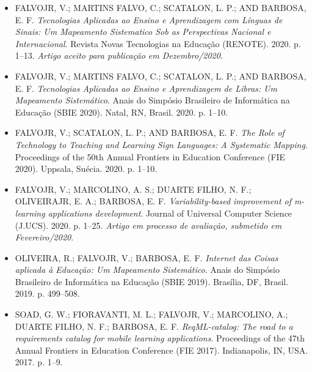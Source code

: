 \begin{itemize}

\item \uppercase{FalvoJr, V.; Martins Falvo, C.; Scatalon, L. P.; and Barbosa, E. F.} \textit{Tecnologias Aplicadas ao Ensino e Aprendizagem com Línguas de Sinais: Um Mapeamento Sistematico Sob as Perspectivas Nacional e Internacional}. Revista Novas Tecnologias na Educação (RENOTE). 2020. p. 1--13. \textit{Artigo aceito para publicação em Dezembro/2020}.

\item \uppercase{FalvoJr, V.; Martins Falvo, C.; Scatalon, L. P.; and Barbosa, E. F.} \textit{Tecnologias Aplicadas ao Ensino e Aprendizagem de Libras: Um Mapeamento Sistemático}. Anais do Simpósio Brasileiro de Informática na Educação (SBIE 2020). Natal, RN, Brasil. 2020. p. 1--10. %

\item \uppercase{FalvoJr, V.; Scatalon, L. P.; and Barbosa, E. F.} \textit{The Role of Technology to Teaching and Learning Sign Languages: A Systematic Mapping}. Proceedings of the 50th Annual Frontiers in Education Conference (FIE 2020). Uppsala, Suécia. 2020. p. 1--10. %

\item \uppercase{FalvoJr, V.; Marcolino, A. S.; Duarte Filho, N. F.; OliveiraJr, E. A.; Barbosa, E. F.} \textit{Variability-based improvement of m-learning applications development}. Journal of Universal Computer Science (J.UCS). 2020. p. 1--25. \textit{Artigo em processo de avaliação, submetido em Fevereiro/2020}.

\item \uppercase{Oliveira, R.; FalvoJr, V.; Barbosa, E. F.} \textit{Internet das Coisas aplicada à Educação: Um Mapeamento Sistemático}. Anais do Simpósio Brasileiro de Informática na Educação (SBIE 2019). Brasília, DF, Brasil. 2019. p. 499--508. %

\item \uppercase{Soad, G. W.; Fioravanti, M. L.; FalvoJr, V.; Marcolino, A.; Duarte Filho, N. F.; Barbosa, E. F.} \textit{ReqML-catalog: The road to a requirements catalog for mobile learning applications}. Proceedings of the 47th Annual Frontiers in Education Conference (FIE 2017). Indianapolis, IN, USA. 2017. p. 1–9. %

\end{itemize}